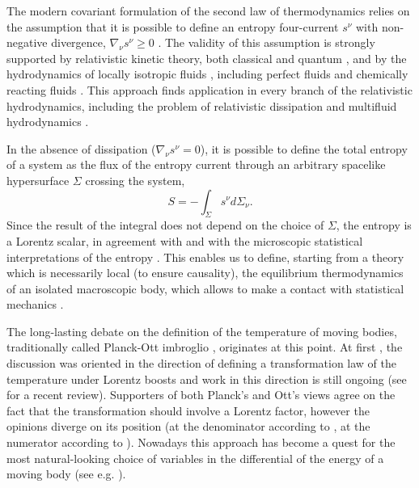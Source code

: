 \documentclass[twocolumn,usenatbib]{mnras2}
\begin{document}

The modern covariant formulation of the second law of thermodynamics relies on the assumption that it is possible to define an entropy four-current $s^\nu$ with non-negative divergence, $\nabla_\nu s^\nu \geq 0$ \citep{Noto_full,Israel2009_book}. The validity of this assumption is strongly supported by relativistic kinetic theory, both classical \citep{cercignani_book} and quantum \citep{degroot_book,Florkowski:2010zz}, and by the hydrodynamics of locally isotropic fluids \citep{Gavassino2020Bulk}, including perfect fluids \citep{rezzolla_book} and chemically reacting fluids \citep{noto_rel}. This approach finds application in every branch of the relativistic hydrodynamics, including the problem of relativistic dissipation \citep{Israel_Stewart_1979,lopez2011} and multifluid hydrodynamics \citep{carter1991,CarterKhal_equivalence,andersson2007review}.

In the absence of dissipation ($\nabla_\nu s^\nu =0$), it is possible to define the total entropy of a system as the flux of the entropy current through an arbitrary spacelike hypersurface $\Sigma$ crossing the system,
\begin{equation}
S =- \int_{\Sigma} s^\nu d\Sigma_\nu.
\end{equation}
Since the result of the integral does not depend on the choice of $\Sigma$, the entropy is a Lorentz scalar, in agreement with \cite{Planck_1908} and with the microscopic statistical interpretations of the entropy \citep{Jaynes1,Jaynes2,Israel_1981_review,VanWeert1982,VonNeumannEntropy2001}. This enables us to define, starting from a theory which is necessarily local (to ensure causality), the equilibrium thermodynamics of an isolated macroscopic body, which allows to make a contact with statistical mechanics \citep{huang_book}.

The long-lasting debate on the definition of the temperature of moving bodies, traditionally called Planck-Ott imbroglio \citep{Mares2017}, originates at this point. At first \citep{Planck_1908,Tolman1933,Ott1963,Landsberg1967_cool}, the discussion was oriented in the direction of defining a transformation law of the temperature under Lorentz boosts and work in this direction is still ongoing (see \citealt{Pinto2017} for a recent review). Supporters of both Planck's and Ott's views agree on the fact that the transformation should involve a Lorentz factor, however the opinions diverge on its position (at the denominator according to \citealt{Planck_1908}, at the numerator according to \citealt{Ott1963}). Nowadays this approach has become a quest for the most natural-looking choice of variables in the differential of the energy of a moving body (see e.g. \citealt{Becattini2016,PARVAN2019}).
\end{document}
